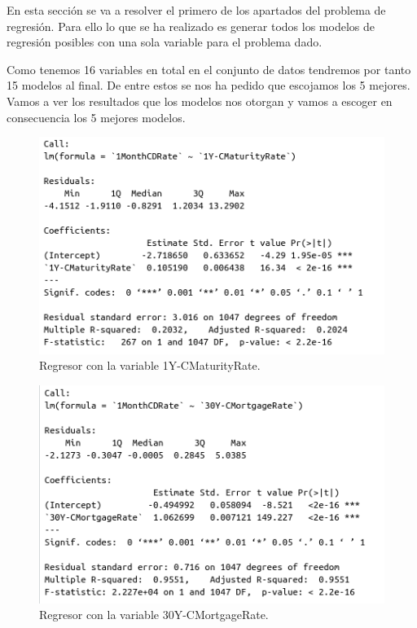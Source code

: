 \documentclass[12pt,a4paper]{article}
\begin{document}
En esta sección se va a resolver el primero de los apartados del problema de regresión. Para ello lo que se ha realizado es generar todos los modelos de regresión posibles con una sola variable para el problema dado.

Como tenemos 16 variables en total en el conjunto de datos tendremos por tanto 15 modelos al final. De entre estos se nos ha pedido que escojamos los 5 mejores. Vamos a ver los resultados que los modelos nos otorgan y vamos a escoger en consecuencia los 5 mejores modelos.

\begin{figure}[H]
	\centering 
	\includegraphics[scale=0.55]{./Imagenes/Regresion/regresor_1va1.png}
	\caption{Regresor con la variable 1Y-CMaturityRate.}
\end{figure}

\begin{figure}[H]
	\centering 
	\includegraphics[scale=0.55]{./Imagenes/Regresion/regresor_1va2.png}
	\caption{Regresor con la variable 30Y-CMortgageRate.}
\end{figure}
\end{document}
